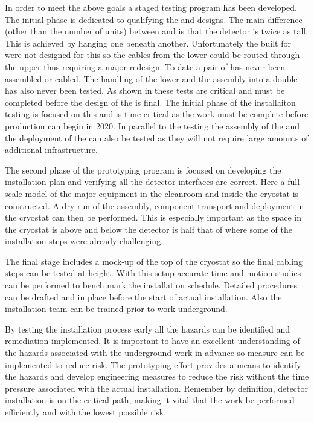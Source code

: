 In order to meet the above goals a staged testing program has been developed.  The initial phase is dedicated to qualifying the  and  designs. The main difference (other than the number of units) between  and   is that the  detector is twice as tall. This is achieved by hanging one  beneath another. Unfortunately the  built for  were not designed for this so the cables from the lower  could be routed through the upper  thus requiring a major redesign. To date a pair of  has never been assembled or cabled. The handling of the lower  and the assembly into a double has also never been tested. As shown in  these tests are critical and must be completed before the design of the  is final. The initial phase of the installaiton testing is focused on this and is time critical as the work must be complete before  production can begin in 2020. In parallel to the  testing the assembly of the  and the deployment of the  can also be tested as they will not require large amounts of additional infrastructure.

The second phase of the prototyping program is focused on developing the installation plan and verifying all the detector interfaces are correct. Here a full scale model of the major equipment in the cleanroom and inside the cryostat is constructed. A dry run of the assembly, component transport and deployment in the cryostat can then be performed. This is especially important as the space in the cryostat is above and below the detector is half that of  where some of the installation steps were already challenging.

The final stage includes a mock-up of the top of the cryostat so the final cabling steps can be tested at height. With this setup accurate time and motion studies can be performed to bench mark the installation schedule. Detailed procedures can be drafted and in place before the start of actual installation. Also the installation team can be trained prior to work underground. 

By testing the installation process early all the hazards can be identified and remediation implemented. It is important to have an excellent understanding of the hazards associated with the underground work in advance so measure can be implemented to reduce risk. The prototyping effort provides a means to identify the hazards and develop engineering measures to reduce the risk without the time pressure associated with the actual installation. Remember by definition, detector installation  is on the critical path, making it vital that the work be performed efficiently and with the lowest possible risk. 

